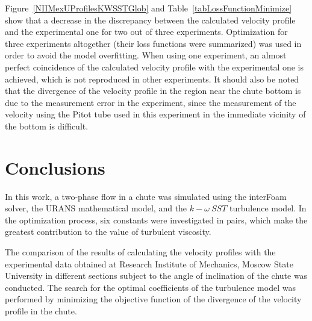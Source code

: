 \documentclass[applsci,article,submit,moreauthors,pdftex]{Definitions/mdpi}
\begin{document}
\begin{paracol}{2}
Figure~\ref{NIIMexUProfilesKWSSTGlob} and Table~\ref{tabLossFunctionMinimize} show that a decrease in the discrepancy between the calculated velocity profile and the experimental one for two out of three experiments. Optimization for three experiments altogether (their loss functions were summarized) was used in order to avoid the model overfitting. When using one experiment, an almost perfect coincidence of the calculated velocity profile with the experimental one is achieved, which is not reproduced in other experiments. It should also be noted that the divergence of the velocity profile in the region near the chute bottom is due to the measurement error in the experiment, since the measurement of the velocity using the Pitot tube used in this experiment in the immediate vicinity of the bottom is difficult.


\section{Conclusions}

In this work, a two-phase flow in a chute was simulated using the interFoam solver, the URANS mathematical model, and the $k-\omega\ SST$ turbulence model. In the optimization process, six constants were investigated in pairs, which make the greatest contribution to the value of turbulent viscosity.

The comparison of the results of calculating the velocity profiles with the experimental data obtained at Research Institute of Mechanics, Moscow State University in different sections subject to the angle of inclination of the chute was conducted. The search for the optimal coefficients of the turbulence model was performed by minimizing the objective function of the divergence of the velocity profile in the chute. %


\end{paracol}
\end{document}
